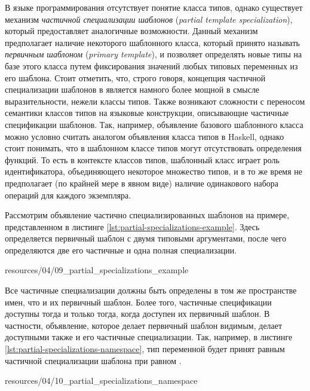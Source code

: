 В языке программирования \cpp отсутствует понятие класса типов, однако существует механизм \emph{частичной специализации шаблонов} (\emph{partial template specialization}), который предоставляет аналогичные возможности. Данный механизм предполагает наличие некоторого шаблонного класса, который принято называть \emph{первичным шаблоном} (\emph{primary template}), и позволяет определять новые типы на базе этого класса путем фиксирования значений любых типовых переменных из его шаблона. Стоит отметить, что, строго говоря, концепция частичной специализации шаблонов в \cpp является намного более мощной в смысле выразительности, нежели классы типов. Также возникают сложности с переносом семантики классов типов на языковые конструкции, описывающие частичные спецификации шаблонов. Так, например, объявление базового шаблонного класса можно условно считать аналогом объявления класса типов в Haskell, однако стоит понимать, что в шаблонном классе типов могут отсутствовать определения функций. То есть в контексте классов типов, шаблонный класс играет роль идентификатора, объединяющего некоторое множество типов, и в то же время не предполагает (по крайней мере в явном виде) наличие одинакового набора операций для каждого экземпляра. 

Рассмотрим объявление частично специализированных шаблонов на примере, представленном в листинге \ref{lst:partial-specializations-example}. Здесь определяется первичный шаблон  с двумя типовыми аргументами, после чего определяются две его частичные и одна полная специализации. 


{resources/04/09_partial_specializations_example}

Все частичные специализации должны быть определены в том же пространстве имен, что и их первичный шаблон. Более того, частичные спецификации доступны тогда и только тогда, когда доступен их первичный шаблон. В частности, объявление, которое делает первичный шаблон видимым, делает доступными также и его частичные специализации. Так, например, в листинге \ref{lst:partial-specializations-namespace}, тип переменной  будет принят равным частичной специализации шаблона  при  равном .


{resources/04/10_partial_specializations_namespace}

